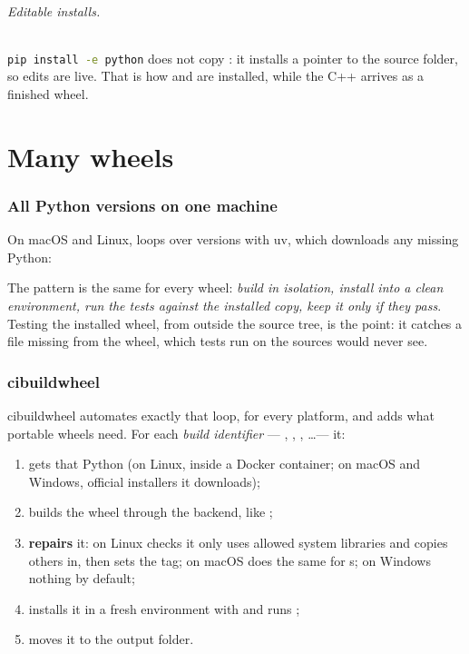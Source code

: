 \documentclass[11pt,a4paper]{article}
\newcommand{\filepiece}[3]{}
\newcommand{\cmd}{\lstinline[language=bash,basicstyle=\ttfamily\small]}
\begin{document}
\paragraph{Editable installs.} \cmd|pip install -e python| does not copy : it
installs a pointer to the source folder, so edits are live. That is how  and
 are installed, while the C++ arrives as a finished wheel.

\part{Many wheels}

\section{All Python versions on one machine}
On macOS and Linux,  loops over versions with uv, which downloads any
missing Python:
\filepiece{build-wheels-sh}{bash}{\code{cpp/scripts/build\_wheels.sh}}
The pattern is the same for every wheel: \emph{build in isolation, install into a clean
environment, run the tests against the installed copy, keep it only if they pass}. Testing the
installed wheel, from outside the source tree, is the point: it catches a file missing from the
wheel, which tests run on the sources would never see.

\section{cibuildwheel}\label{sec:cibw}
cibuildwheel automates exactly that loop, for every platform, and adds what portable wheels need.
For each \emph{build identifier} --- , ,
, \dots --- it:
\begin{enumerate}
  \item gets that Python (on Linux, inside a  Docker container; on macOS and
        Windows, official installers it downloads);
  \item builds the wheel through the backend, like ;
  \item \textbf{repairs} it: on Linux  checks it only uses allowed system libraries
        and copies others in, then sets the  tag; on macOS  does the
        same for s; on Windows nothing by default;
  \item installs it in a fresh environment with  and runs ;
  \item moves it to the output folder.
\end{enumerate}
\end{document}

